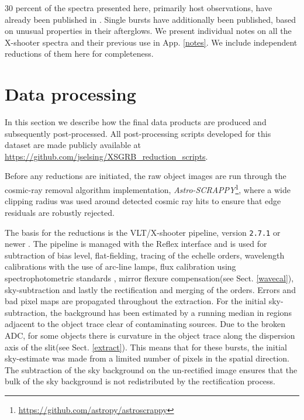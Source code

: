 \documentclass{aa}    %
\begin{document}
30 percent of the spectra presented here, primarily host observations, have
already been published in \citet{Kruhler2015}. Single bursts have additionally
been published, based on unusual properties in their afterglows. We present
individual notes on all the X-shooter spectra and their previous use in App.
\ref{notes}. We include independent reductions of them here for completeness.

\section{Data processing} \label{proc}

In this section we describe how the final data products are produced and
subsequently post-processed. 
All post-processing scripts developed for this dataset are made publicly
available at \url{https://github.com/jselsing/XSGRB_reduction_scripts}.

Before any reductions are initiated, the raw object images are run through the
cosmic-ray removal algorithm \citep{VanDokkum2001} implementation,
\textit{Astro-SCRAPPY}\footnote{\url{https://github.com/astropy/astroscrappy}},
where a wide clipping radius was used around detected cosmic ray hits to ensure
that edge residuals are robustly rejected.

The basis for the reductions is the VLT/X-shooter pipeline, version
\texttt{2.7.1} or newer \citep{Goldoni2006, Modigliani2010}. The pipeline is
managed with the Reflex interface \citep{Freudling2013} and is used for
subtraction of bias level, flat-fielding, tracing of the echelle orders,
wavelength calibrations with the use of arc-line lamps, flux calibration using
spectrophotometric standards \citep{Vernet2010, Hamuy1994}, mirror flexure
compensation(see Sect. \ref{wavecal}), sky-subtraction and lastly the
rectification and merging of the orders. Errors and bad pixel maps are
propagated throughout the extraction. For the initial sky-subtraction, the
background has been estimated by a running median in regions adjacent to the
object trace clear of contaminating sources. Due to the broken ADC, for some
objects there is curvature in the object trace along the dispersion axis of the
slit(see Sect. \ref{extract}). This means that for these bursts, the initial
sky-estimate was made from a limited number of pixels in the spatial direction.
The subtraction of the sky background on the un-rectified image ensures that the
bulk of the sky background is not redistributed by the rectification process.
\end{document}
